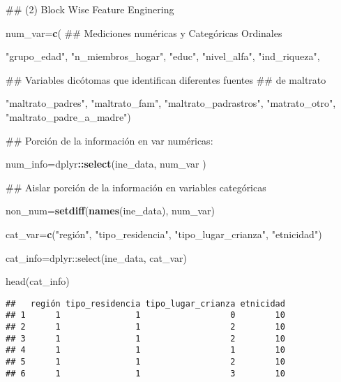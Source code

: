 \documentclass[]{article}
\newenvironment{Shaded}{\begin{snugshade}}{\end{snugshade}}
\newcommand{\KeywordTok}[1]{\textcolor[rgb]{0.13,0.29,0.53}{\textbf{#1}}}
\newcommand{\StringTok}[1]{\textcolor[rgb]{0.31,0.60,0.02}{#1}}
\newcommand{\OperatorTok}[1]{\textcolor[rgb]{0.81,0.36,0.00}{\textbf{#1}}}
\newcommand{\NormalTok}[1]{#1}
\begin{document}
\begin{Shaded}
\begin{Highlighting}[]
\NormalTok{## (2) Block Wise Feature Enginering}

\NormalTok{num_var=}\KeywordTok{c}\NormalTok{(}
\NormalTok{  ## Mediciones numéricas y Categóricas Ordinales}
  
  \StringTok{"grupo_edad"}\NormalTok{,}
  \StringTok{"n_miembros_hogar"}\NormalTok{, }
  \StringTok{"educ"}\NormalTok{,}
  \StringTok{"nivel_alfa"}\NormalTok{, }
  \StringTok{"ind_riqueza"}\NormalTok{,}
  
\NormalTok{  ## Variables dicótomas que identifican diferentes fuentes}
\NormalTok{  ## de maltrato}
  
  \StringTok{"maltrato_padres"}\NormalTok{, }
  \StringTok{"maltrato_fam"}\NormalTok{,}
  \StringTok{"maltrato_padrastros"}\NormalTok{,}
  \StringTok{"matrato_otro"}\NormalTok{,    }
  \StringTok{"maltrato_padre_a_madre"}\NormalTok{)}


\NormalTok{## Porción de la información en var numéricas:}

\NormalTok{num_info=dplyr}\OperatorTok{::}\KeywordTok{select}\NormalTok{(ine_data, num_var )}


\NormalTok{## Aislar porción de la información en variables categóricas}

\NormalTok{non_num=}\KeywordTok{setdiff}\NormalTok{(}\KeywordTok{names}\NormalTok{(ine_data), num_var)}

\NormalTok{cat_var=}\KeywordTok{c}\NormalTok{(}\StringTok{"región",}
\StringTok{          "}\NormalTok{tipo_residencia}\StringTok{",}
\StringTok{          "}\NormalTok{tipo_lugar_crianza}\StringTok{",}
\StringTok{          "}\NormalTok{etnicidad}\StringTok{")}

\StringTok{cat_info=dplyr::select(ine_data, cat_var)}

\StringTok{head(cat_info)}
\end{Highlighting}
\end{Shaded}

\begin{verbatim}
##   región tipo_residencia tipo_lugar_crianza etnicidad
## 1      1               1                  0        10
## 2      1               1                  2        10
## 3      1               1                  2        10
## 4      1               1                  1        10
## 5      1               1                  2        10
## 6      1               1                  3        10
\end{verbatim}
\end{document}
